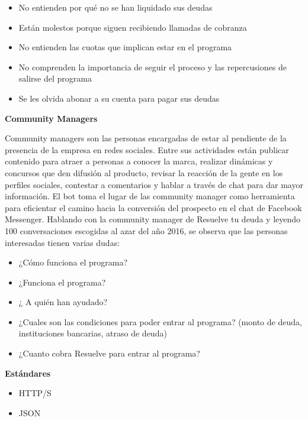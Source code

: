 \begin{itemize}
\item No entienden por qué no se han liquidado sus deudas
\item Están molestos porque siguen recibiendo llamadas de cobranza
\item No entienden las cuotas que implican estar en el programa
\item No comprenden la importancia de seguir el proceso y las repercusiones de salirse del programa
\item Se les olvida abonar a su cuenta para pagar sus deudas
\end{itemize}


\textbf{Community Managers}

Community managers son las personas encargadas de estar al pendiente de la presencia de la empresa en redes sociales. Entre sus actividades están publicar contenido para atraer a personas a conocer la marca, realizar dinámicas y concursos que den difusión al producto, revisar la reacción de la gente en los perfiles sociales, contestar a comentarios y hablar a través de chat para dar mayor información. El bot toma el lugar de las community manager como herramienta para eficientar el camino hacia la conversión del prospecto en el chat de Facebook Messenger. 
Hablando con la community manager de Resuelve tu deuda y leyendo 100 conversaciones escogidas al azar del año 2016, se observa que las personas interesadas tienen varias dudas:

\begin{itemize}
\item ¿Cómo funciona el programa?
\item ¿Funciona el programa?
\item ¿ A quién han ayudado?
\item ¿Cuales son las condiciones para poder entrar al programa? (monto de deuda, instituciones bancarias, atraso de deuda)
\item ¿Cuanto cobra Resuelve para entrar al programa?
\end{itemize}


\textbf{Estándares}
\begin{itemize}
\item HTTP/S
\item JSON
\end{itemize}

